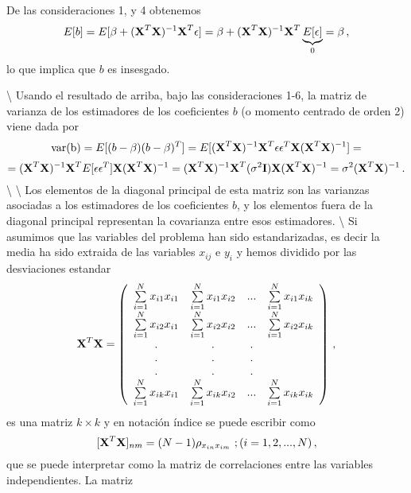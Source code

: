 \documentclass[
]{agujournal2019}
\begin{document}
\noindent De las consideraciones 1, y 4 obtenemos
\[E[b]=E[\beta + ({\textbf X}^T{\textbf X})^{-1}{\textbf X}^T\epsilon]=
  \beta + ({\textbf X}^T{\textbf X})^{-1}{\textbf X}^T \underbrace{E[\epsilon]}_{0}=\beta\,,\]
lo que implica que \(b\) es insesgado.

\vspace{0.5cm}

 \textbackslash{}
\noindent Usando el resultado de arriba, bajo las consideraciones 1-6,
la matriz de varianza de los estimadores de los coeficientes \(b\) (o
momento centrado de orden 2) viene dada por
\[{\rm var(b)}=E[(b-\beta)(b-\beta)^T]=E[({\textbf X}^T{\textbf X})^{-1}{\textbf X}^T\epsilon \epsilon^T{\textbf X}
    ({\textbf X}^T{\textbf X})^{-1}]=\]
\[=({\textbf X}^T{\textbf X})^{-1}{\textbf X}^T E[\epsilon \epsilon^T]{\textbf X}({\textbf X}^T{\textbf X})^{-1}=
    ({\textbf X}^T{\textbf X})^{-1}{\textbf X}^T(\sigma^2{\textbf I}){\textbf X}({\textbf X}^T{\textbf X})^{-1}=
    \sigma^2({\textbf X}^T{\textbf X})^{-1}\,.\] \textbackslash{}
\textbackslash{} \noindent Los elementos de la diagonal principal de
esta matriz son las varianzas asociadas a los estimadores de los
coeficientes \(b\), y los elementos fuera de la diagonal principal
representan la covarianza entre esos estimadores. \textbackslash{} Si
asumimos que las variables del problema han sido estandarizadas, es
decir la media ha sido extraida de las variables \(x_{ij}\) e \(y_i\) y
hemos dividido por las desviaciones estandar
\[{\textbf X}^T{\textbf X}=\left(\begin{array}{cccc}
   \sum\limits_{i=1}^N{x_{i1}x_{i1}} & \sum\limits_{i=1}^N{x_{i1}x_{i2}} & ... & \sum\limits_{i=1}^N{x_{i1}x_{ik}}\\
   \sum\limits_{i=1}^N{x_{i2}x_{i1}} & \sum\limits_{i=1}^N{x_{i2}x_{i2}} & ... & \sum\limits_{i=1}^N{x_{i2}x_{ik}}\\
                . & . & . \\
        . & . & . \\
        . & . & . \\
   \sum\limits_{i=1}^N{x_{ik}x_{i1}} & \sum\limits_{i=1}^N{x_{ik}x_{i2}} & ... & \sum\limits_{i=1}^N{x_{ik}x_{ik}}\\
        \end{array}\right)\,,\] es una matriz \(k\times k\) y en
notación índice se puede escribir como
\[[{\textbf X}^T{\textbf X}]_{nm}=(N-1)\rho_{x_{in} x_{im}}\,\,;(i=1,2,...,N)\,,\]
que se puede interpretar como la matriz de correlaciones entre las
variables independientes. La matriz
\end{document}
